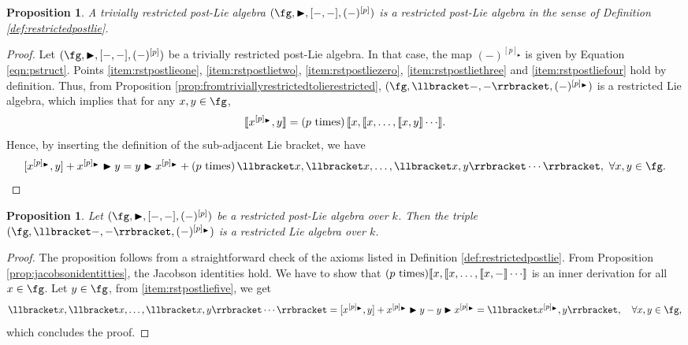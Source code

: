 \documentclass[12pt]{article}
\newcommand{\red}{\color{red}}
\newcommand{\btr}{\blacktriangleright}
\newtheorem{proposition}[theorem]{Proposition}
\begin{document}
\begin{proposition}
A trivially restricted post-Lie algebra $(\fg,\btr, [-,-],(-)^{[p]})$ is a restricted post-Lie algebra in the sense of Definition \ref{def:restrictedpostlie}.
\end{proposition}
\begin{proof}
Let  $(\fg,\btr, [-,-], (-)^{[p]})$ be a trivially restricted post-Lie algebra. In that case, the map $(-)^{[p]_{\btr}}$ is given by Equation \eqref{eqn:pstruct}. Points \ref{item:rstpostlieone}, \ref{item:rstpostlietwo}, \ref{item:rstpostliezero}, \ref{item:rstpostliethree} and \ref{item:rstpostliefour} hold by definition. Thus, from Proposition \ref{prop:fromtriviallyrestrictedtolierestricted}, $(\fg,\llbracket -,- \rrbracket, (-)^{[p]_{\btr}})$ is a restricted Lie algebra, which implies that for any $x,y\in \fg$,
$$
\llbracket x^{[p]_{\btr}}, y\rrbracket = (p~{\rm times} )\,\llbracket x, \llbracket x, \ldots,\llbracket x,y \rrbracket \cdots \rrbracket.
$$
Hence, by inserting the definition of the sub-adjacent Lie bracket, we have
$$
[x^{[p]_{\btr}},y] + x^{[p]_{\btr}}\btr y  =  y \btr x^{[p]_{\btr}} + (p~{\rm times} )\,\llbracket x, \llbracket x, \ldots,\llbracket x,y \rrbracket \cdots \rrbracket,~\forall x,y\in\fg.
$$
\end{proof}

\begin{proposition} 
\label{prop:restrictedadjacent}
Let $(\fg,\btr, [-,-], (-)^{[p]})$ be a restricted post-Lie algebra over $k$. Then the triple $(\fg, \llbracket -,- \rrbracket, (-)^{[p]_{\btr}})$ is a restricted Lie algebra over $k$.
\end{proposition}
\begin{proof} The proposition follows from a straightforward check of the axioms listed in Definition \ref{def:restrictedpostlie}. From Proposition \ref{prop:jacobsonidentitties}, the Jacobson identities hold. We have to show that $(p~{\rm times} )\llbracket x, \llbracket x, \ldots,\llbracket x,- \rrbracket \cdots \rrbracket$ is an inner derivation for all $x\in \fg$. Let $y\in \fg$, from \eqref{item:rstpostliefive}, we get 
\begin{align*}
\llbracket x, \llbracket x, \ldots,\llbracket x,y \rrbracket \cdots \rrbracket = [x^{[p]_{\btr}},y] + x^{[p]_{\btr}}\btr y - y \btr x^{[p]_{\btr}} = \llbracket x^{[p]_{\btr}}, y\rrbracket,\quad\forall x,y\in \fg,
\end{align*}
which concludes the proof.
\end{proof}
\end{document}
